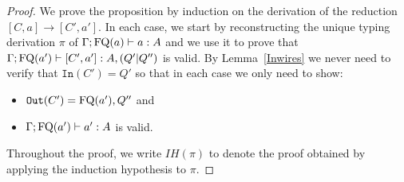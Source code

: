 \documentclass[twoside]{article}
\begin{document}
\begin{proof}
We prove the proposition by induction on the derivation of the reduction 
 $[C,a]\to[C',a']$. In each case, we start by reconstructing 
the unique typing derivation $\pi$ of $\Gamma;\mathop{\textrm{FQ}}\nolimits(a)\vdash a:A$ and we use 
it to prove that $\Gamma;\mathop{\textrm{FQ}}\nolimits(a')\vdash [C',a']:A,(Q'|Q'')$ is valid. 
By Lemma~\hyperref[Inwires]{\ref*{Inwires}} we never need to 
verify that $\mathtt{In}(C')=Q'$ so that in each case we only 
need to show:
\begin{itemize}
  \item $\mathtt{Out}(C')=\mathop{\textrm{FQ}}\nolimits(a'),Q''$ and
  \item $\Gamma;\mathop{\textrm{FQ}}\nolimits(a')\vdash a':A$ is valid.
\end{itemize}
Throughout the proof, we write $IH(\pi)$ to denote the proof obtained by applying 
the induction hypothesis to $\pi$.


\end{proof}
\end{document}
